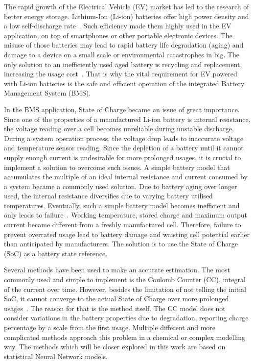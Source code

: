 The rapid growth of the Electrical Vehicle (EV) market has led to the research of better energy storage.
Lithium-Ion (Li-ion) batteries offer high power density and a low self-discharge rate~\cite{han_review, en13082106}.
Such efficiency made them highly used in the EV application, on top of smartphones or other portable electronic devices.
The misuse of those batteries may lead to rapid battery life degradation (aging) and damage to a device on a small scale or environmental catastrophes in big.
The only solution to an inefficiently used aged battery is recycling and replacement, increasing the usage cost~\cite{skeete_beyond_2020}.
That is why the vital requirement for EV powered with Li-ion batteries is the safe and efficient operation of the integrated Battery Management System (BMS).

%
%
In the BMS application, State of Charge became an issue of great importance.
Since one of the properties of a manufactured Li-ion battery is internal resistance, the voltage reading over a cell becomes unreliable during unstable discharge.
During a system operation process, the voltage drop leads to inaccurate voltage and temperature sensor reading.
Since the depletion of a battery until it cannot supply enough current is undesirable for more prolonged usages, it is crucial to implement a solution to overcome such issues.
A simple battery model that accumulates the multiple of an ideal internal resistance and current consumed by a system became a commonly used solution.
Due to battery aging over longer used, the internal resistance diversifies due to varying battery utilised temperatures.
Eventually, such a simple battery model becomes inefficient and only leads to failure~\cite{fenrg.2019.00065}.
Working temperature, stored charge and maximum output current became different from a freshly manufactured cell.
Therefore, failure to prevent overrated usage lead to battery damage and waisting cell potential earlier than anticipated by manufacturers.
The solution is to use the State of Charge (SoC) as a battery state reference.

%
%
Several methods have been used to make an accurate estimation.
The most commonly used and simple to implement is the Coulomb Counter (CC), integral of the current over time.
However, besides the limitation of not telling the initial SoC, it cannot converge to the actual State of Charge over more prolonged usages~\cite{ng_enhanced_2009}.
The reason for that is the method itself.
The CC model does not consider variations in the battery properties due to degradation, reporting charge percentage by a scale from the first usage.
Multiple different and more complicated methods approach this problem in a chemical or complex modelling way.
The methods which will be closer explored in this work are based on statistical Neural Network models.

